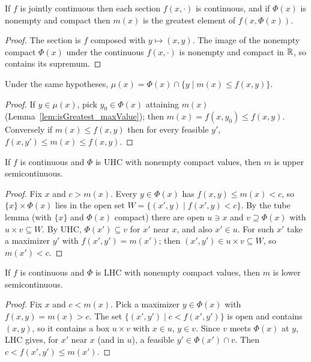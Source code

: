\begin{lemma}
\label{lem:isGreatest_maxValue}
\leanok
{}
If $f$ is jointly continuous then each section $f(x, \cdot)$ is continuous, and if $\Phi(x)$ is nonempty
and compact then $m(x)$ is the greatest element of $f(x, \Phi(x))$.
\end{lemma}
\begin{proof}
\leanok
The section is $f$ composed with $y \mapsto (x, y)$. The image of the nonempty compact $\Phi(x)$
under the continuous $f(x, \cdot)$ is nonempty and compact in $\mathbb{R}$, so contains its supremum.
\end{proof}

\begin{lemma}
\label{lem:argmax_eq}
\leanok
{}
Under the same hypotheses, $\mu(x) = \Phi(x) \cap \{y \mid m(x) \le f(x, y)\}$.
\end{lemma}
\begin{proof}
\leanok
If $y \in \mu(x)$, pick $y_0 \in \Phi(x)$ attaining $m(x)$ (Lemma~\ref{lem:isGreatest_maxValue});
then $m(x) = f(x, y_0) \le f(x, y)$. Conversely if $m(x) \le f(x, y)$ then for every feasible $y'$,
$f(x, y') \le m(x) \le f(x, y)$.
\end{proof}

\begin{theorem}
\label{thm:usc_maxValue}
\leanok
{}
If $f$ is continuous and $\Phi$ is UHC with nonempty compact values, then $m$ is upper semicontinuous.
\end{theorem}
\begin{proof}
\leanok
Fix $x$ and $c > m(x)$. Every $y \in \Phi(x)$ has $f(x, y) \le m(x) < c$, so $\{x\} \times \Phi(x)$ lies in
the open set $W = \{(x', y) \mid f(x', y) < c\}$. By the tube lemma (with $\{x\}$ and $\Phi(x)$ compact)
there are open $u \ni x$ and $v \supseteq \Phi(x)$ with $u \times v \subseteq W$. By UHC,
$\Phi(x') \subseteq v$ for $x'$ near $x$, and also $x' \in u$. For such $x'$ take a maximizer $y'$
with $f(x', y') = m(x')$; then $(x', y') \in u \times v \subseteq W$, so $m(x') < c$.
\end{proof}

\begin{theorem}
\label{thm:lsc_maxValue}
\leanok
{}
If $f$ is continuous and $\Phi$ is LHC with nonempty compact values, then $m$ is lower semicontinuous.
\end{theorem}
\begin{proof}
\leanok
Fix $x$ and $c < m(x)$. Pick a maximizer $y \in \Phi(x)$ with $f(x, y) = m(x) > c$. The set
$\{(x', y') \mid c < f(x', y')\}$ is open and contains $(x, y)$, so it contains a box $u \times v$ with
$x \in u$, $y \in v$. Since $v$ meets $\Phi(x)$ at $y$, LHC gives, for $x'$ near $x$ (and in $u$), a
feasible $y' \in \Phi(x') \cap v$. Then $c < f(x', y') \le m(x')$.
\end{proof}

